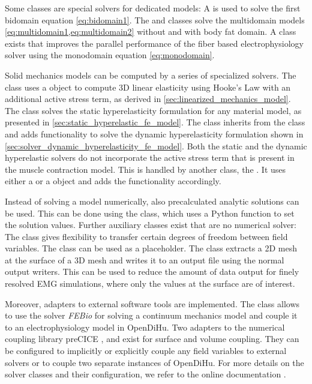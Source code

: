 Some classes are special solvers for dedicated models: A  is used to solve the first bidomain equation \cref{eq:bidomain1}. The  and  classes solve the multidomain models \cref{eq:multidomain1,eq:multidomain2} without and with body fat domain. A class  exists that improves the parallel performance of the fiber based electrophysiology solver using the monodomain equation \cref{eq:monodomain}.

Solid mechanics models can be computed by a series of specialized solvers. The  class uses a  object to compute 3D linear elasticity using Hooke's Law with an additional active stress term, as derived in \cref{sec:linearized_mechanics_model}. The  class solves the static hyperelasticity formulation for any material model, as presented in \cref{sec:static_hyperelastic_fe_model}. The  class inherits from the  class and adds functionality to solve the dynamic hyperelasticity formulation shown in \cref{sec:solver_dynamic_hyperelasticity_fe_model}. 
Both the static and the dynamic hyperelastic solvers do not incorporate the active stress term that is present in the muscle contraction model. This is handled by another class, the . It uses either a  or a  object and adds the functionality accordingly.

Instead of solving a model numerically, also precalculated analytic solutions can be used. This can be done using the  class, which uses a Python function to set the solution values. Further auxiliary classes exist that are no numerical solver: The  class gives flexibility to transfer certain degrees of freedom between field variables. The  class can be used as a placeholder. The  class extracts a 2D mesh at the surface of a 3D mesh and writes it to an output file using the normal output writers. This can be used to reduce the amount of data output for finely resolved EMG simulations, where only the values at the surface are of interest.

Moreover, adapters to external software tools are implemented. The class  allows to use the solver \emph{FEBio} \cite{Maas2012,maas2017febio} for solving a continuum mechanics model and couple it to an electrophysiology model in OpenDiHu.
Two adapters to the numerical coupling library preCICE \cite{precice},  and  exist for surface and volume coupling. They can be configured to implicitly or explicitly couple any field variables to external solvers or to couple two separate instances of OpenDiHu.
For more details on the solver classes and their configuration, we refer to the online documentation \cite{opendihuWeb}.

